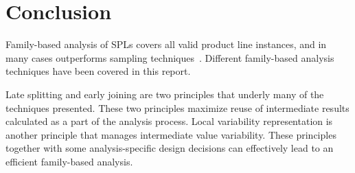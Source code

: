 \documentclass[11pt]{article}
\begin{document}
\section{Conclusion}

Family-based analysis of SPLs covers all valid product line instances, and in many cases outperforms sampling techniques~\cite{Apel:2013, Liebig:2013}. Different family-based analysis techniques have been covered in this report. 

Late splitting and early joining are two principles that underly many of the techniques presented. These two principles maximize reuse of intermediate results calculated as a part of the analysis process. Local variability representation is another principle that manages intermediate value variability. These principles together with some analysis-specific design decisions can effectively lead to an efficient family-based analysis.

 
\end{document}
